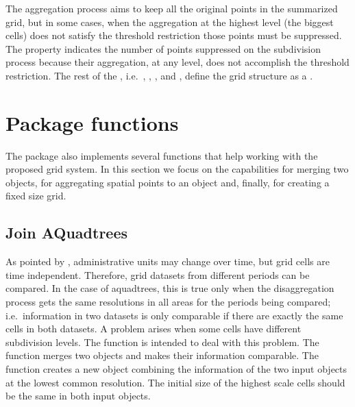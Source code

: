 The aggregation process aims to keep all the original points in the summarized grid, but in some cases, when the aggregation at the highest level (the biggest cells) does not satisfy the threshold restriction those points must be suppressed. The  property indicates the number of points suppressed on the subdivision process because their aggregation, at any level, does not accomplish the threshold restriction. The rest of the , i.e.\ , , ,  and , define the grid structure as a .

\section{Package functions} \label{sec:functions}

The  package also implements several functions that help working with the proposed grid system. In this section we focus on the capabilities for merging two  objects, for aggregating spatial points to an  object and, finally, for creating a fixed size grid.

\subsection{Join AQuadtrees} \label{sec:join}

As pointed by \cite{Martin2002}, administrative units may change over time, but grid cells are time independent. Therefore, grid datasets from different periods can be compared. In the case of aquadtrees, this is true only when the disaggregation process gets the same resolutions in all areas for the periods being compared; i.e.\ information in two datasets is only comparable if there are exactly the same cells in both datasets. A problem arises when some cells have different subdivision levels. The function  is intended to deal with this problem.
The function  merges two  objects and makes their information comparable. The function creates a new  object combining the information of the two input objects at the lowest common resolution. The initial size of the highest scale cells should be the same in both input objects. 

